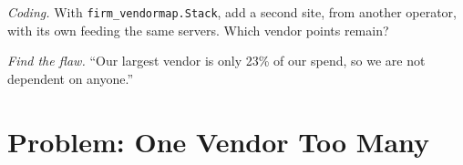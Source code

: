 \begin{exercise}[$\star\star\star$]\label{exo:nw:the-vendor-map:7}
\emph{Coding.} With \texttt{firm\_vendormap.Stack}, add a second  site, from another operator, with its own  feeding the same servers.
Which vendor points remain?
\end{exercise}

\begin{exercise}[$\star\star\star$]\label{exo:nw:the-vendor-map:8}
\emph{Find the flaw.} ``Our largest vendor is only 23\% of our spend, so we are not dependent on anyone.''
\end{exercise}

\section{Problem: One Vendor Too Many}

